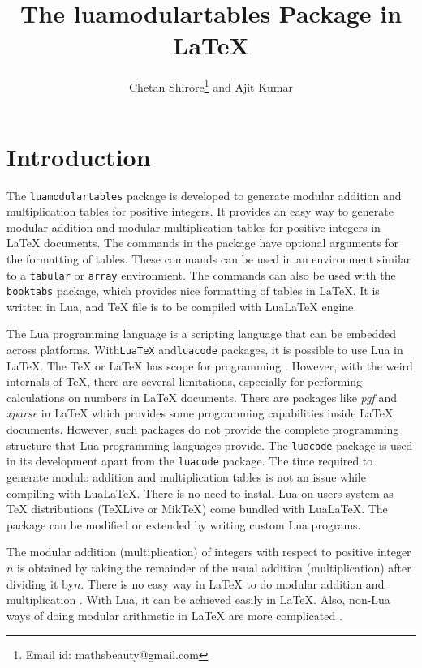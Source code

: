 ﻿\documentclass{article}
\begin{document}
\title{The luamodulartables Package in LaTeX}
\author{Chetan Shirore\thanks{Email id: mathsbeauty@gmail.com} \space  and Ajit Kumar}
\maketitle
\section{Introduction}\label{section:introduction}
The \verb|luamodulartables| package is developed to generate modular addition and multiplication tables for positive integers. It provides an easy way to generate modular addition and modular multiplication tables for positive integers in LaTeX documents. The commands in the package have optional arguments for the formatting of tables. These commands can be used in an environment similar to a  \verb|tabular| or \verb|array| environment. The commands can also be used with the \verb|booktabs| package, which provides nice formatting of tables in LaTeX. It is written in Lua, and TeX file is to be compiled with LuaLaTeX engine.


The Lua \cite{online.luaorg} programming language is a scripting language that can be embedded across platforms. With\verb|LuaTeX| \cite{online.luatex}  and\verb|luacode| \cite{online.luacode} packages, it is possible to use Lua in LaTeX. The TeX  \cite{online.tex} or LaTeX has scope for programming \cite{online.texscript}. However, with the weird internals of TeX, there are several limitations, especially for performing calculations on numbers in LaTeX documents. There are packages like \emph{pgf} \cite{online.pgf} and  \emph{xparse}  \cite{online.xparse} in LaTeX which provides some programming capabilities inside LaTeX documents. However, such packages do not provide the complete programming structure that Lua programming languages provide. The \verb|luacode| \cite{online.luacode}  package is used in its development apart from the \verb|luacode| package. The time required to generate modulo addition and multiplication tables is not an issue while compiling with LuaLaTeX. There is no need to install Lua on users system as TeX distributions (TeXLive or MikTeX) come bundled with LuaLaTeX. The package can be modified or extended by writing custom Lua programs.

The modular addition (multiplication) of integers with respect to positive integer \(n\) is obtained by taking the remainder of the usual addition (multiplication) after dividing it by\(n\). There is no easy way in LaTeX to do modular addition and multiplication \cite{online.modularithmetic}. With Lua, it can be achieved easily in LaTeX. Also, non-Lua ways of doing modular arithmetic in LaTeX are more complicated  \cite{online.modularithmetic2}.
\end{document}
